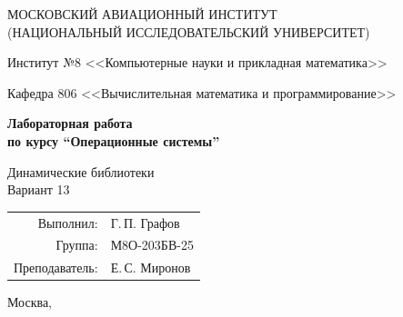 \begin{titlepage}
\begin{center}
\large
МОСКОВСКИЙ АВИАЦИОННЫЙ ИНСТИТУТ\\ (НАЦИОНАЛЬНЫЙ ИССЛЕДОВАТЕЛЬСКИЙ УНИВЕРСИТЕТ)

\vspace{20pt}
Институт №8 <<Компьютерные науки и прикладная математика>>

Кафедра 806 <<Вычислительная математика и программирование>>
\end{center}
\vspace{60pt}
\begin{center}
\bfseries\large
Лабораторная работа  \\по курсу \enquote{Операционные системы}
\vspace{24pt}

Динамические библиотеки\\
Вариант 13
\vspace{30pt}
\end{center}
\vfill
\begin{flushright}
\large
\begin{tabular}{rl}
Выполнил: & Г.\,П. Графов \\
Группа: & М8О-203БВ-25 \\
Преподаватель: & Е.\,С. Миронов \\
\end{tabular}
\end{flushright}
\vspace{92pt}
\begin{center}\large Москва, \the\year\end{center}
\end{titlepage}
\pagebreak
